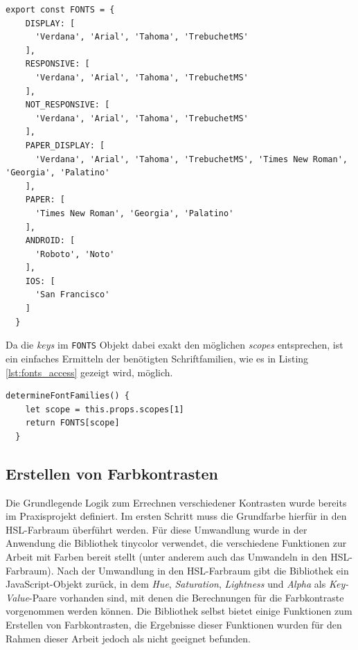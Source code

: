 \begin{lstlisting}[caption=Aufbau des \texttt{FONTS} Objektes, label=lst:fonts_object]
  export const FONTS = {
    DISPLAY: [
      'Verdana', 'Arial', 'Tahoma', 'TrebuchetMS'
    ],
    RESPONSIVE: [
      'Verdana', 'Arial', 'Tahoma', 'TrebuchetMS'
    ],
    NOT_RESPONSIVE: [
      'Verdana', 'Arial', 'Tahoma', 'TrebuchetMS'
    ],
    PAPER_DISPLAY: [
      'Verdana', 'Arial', 'Tahoma', 'TrebuchetMS', 'Times New Roman', 'Georgia', 'Palatino'
    ],
    PAPER: [
      'Times New Roman', 'Georgia', 'Palatino'
    ],
    ANDROID: [
      'Roboto', 'Noto'
    ],
    IOS: [
      'San Francisco'
    ]
  }
\end{lstlisting}

Da die \textit{keys} im \verb|FONTS| Objekt dabei exakt den möglichen \textit{scopes} entsprechen\footnotemark{}, ist ein einfaches Ermitteln der benötigten Schriftfamilien, wie es in Listing \ref{lst:fonts_access} gezeigt wird, möglich.


\begin{lstlisting}[caption=Zugriff auf Werte des \texttt{FONTS} Objektes, label=lst:fonts_access]
  determineFontFamilies() {
    let scope = this.props.scopes[1]
    return FONTS[scope]
  }
\end{lstlisting}

\subsection{Erstellen von Farbkontrasten}
\label{chap:colors_dev}
Die Grundlegende Logik zum Errechnen verschiedener Kontrasten wurde bereits im Praxisprojekt definiert. Im ersten Schritt muss die Grundfarbe hierfür in den HSL-Farbraum überführt werden. Für diese Umwandlung wurde in der Anwendung die Bibliothek tinycolor\footnotemark{} verwendet, die verschiedene Funktionen zur Arbeit mit Farben bereit stellt (unter anderem auch das Umwandeln in den HSL-Farbraum).
Nach der Umwandlung in den HSL-Farbraum gibt die Bibliothek ein JavaScript-Objekt zurück, in dem \textit{Hue}, \textit{Saturation}, \textit{Lightness} und \textit{Alpha} als \textit{Key-Value}-Paare vorhanden sind, mit denen die Berechnungen für die Farbkontraste vorgenommen werden können. Die Bibliothek selbst bietet einige Funktionen zum Erstellen von Farbkontrasten, die Ergebnisse dieser Funktionen wurden für den Rahmen dieser Arbeit jedoch als nicht geeignet befunden.

